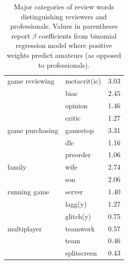 \documentclass[letterpaper]{article}
\begin{document}
\begin{table}[tb!]
\begin{tabular}{llc}
\midrule 
game reviewing 
& metacrit(ic) & 3.03 \\ 
& bias & 2.45 \\ 
& opinion & 1.46 \\ 
& critic & 1.27 \\ [2ex]

\midrule 
game purchasing 
& gamestop & 3.31 \\ 
& dlc & 1.16 \\ 
& preorder & 1.06 \\ [2ex]

\midrule 
family 
& wife & 2.74 \\ 
& son & 2.06 \\ [2ex]

\midrule 
running game 
& server & 1.40 \\ 
& lagg(y) & 1.27 \\ 
& glitch(y) & 0.75 \\ [2ex]

\midrule 
multiplayer 
& teamwork & 0.57 \\ 
& team & 0.46 \\ 
& splitscreen & 0.43 \\

\end{tabular}
\caption{Major categories of review words distinguishing reviewers and professionals. Values in parentheses report $\beta$ coefficients from binomial regression model where positive weights predict amateurs (as opposed to professionals).}
\label{tab:user_classification_coef}
\end{table}
\end{document}
